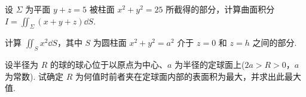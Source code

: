 	\begin{ti}
		设 $\varSigma$ 为平面 $y + z = 5$ 被柱面 $x^{2} + y^{2} = 25$ 所截得的部分，计算曲面积分 $I = \iint_{\varSigma} (x + y + z) \dd{S}$.
	\end{ti}

	\begin{ti}
		计算 $\iint_{S} x^{2} \dd{S}$，其中 $S$ 为圆柱面 $x^{2} + y^{2} = a^{2}$ 介于 $z = 0$ 和 $z = h$ 之间的部分.
	\end{ti}

	\begin{ti}
		设半径为 $R$ 的球的球心位于以原点为中心、$a$ 为半径的定球面上($2a > R > 0$，$a$ 为常数). 试确定 $R$ 为何值时前者夹在定球面内部的表面积为最大，并求出此最大值.
	\end{ti}